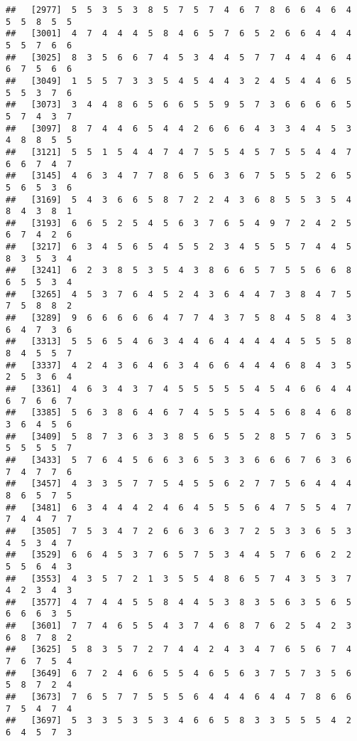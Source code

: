 \documentclass[
]{book}
\begin{document}
\begin{verbatim}
##   [2977]  5  5  3  5  3  8  5  7  5  7  4  6  7  8  6  6  4  6  4  5  5  8  5  5
##   [3001]  4  7  4  4  4  5  8  4  6  5  7  6  5  2  6  6  4  4  4  5  5  7  6  6
##   [3025]  8  3  5  6  6  7  4  5  3  4  4  5  7  7  4  4  4  6  4  6  7  5  6  6
##   [3049]  1  5  5  7  3  3  5  4  5  4  4  3  2  4  5  4  4  6  5  5  5  3  7  6
##   [3073]  3  4  4  8  6  5  6  6  5  5  9  5  7  3  6  6  6  6  5  5  7  4  3  7
##   [3097]  8  7  4  4  6  5  4  4  2  6  6  6  4  3  3  4  4  5  3  4  8  8  5  5
##   [3121]  5  5  1  5  4  4  7  4  7  5  5  4  5  7  5  5  4  4  7  6  6  7  4  7
##   [3145]  4  6  3  4  7  7  8  6  5  6  3  6  7  5  5  5  2  6  5  5  6  5  3  6
##   [3169]  5  4  3  6  6  5  8  7  2  2  4  3  6  8  5  5  3  5  4  8  4  3  8  1
##   [3193]  6  6  5  2  5  4  5  6  3  7  6  5  4  9  7  2  4  2  5  6  7  4  2  6
##   [3217]  6  3  4  5  6  5  4  5  5  2  3  4  5  5  5  7  4  4  5  8  3  5  3  4
##   [3241]  6  2  3  8  5  3  5  4  3  8  6  6  5  7  5  5  6  6  8  6  5  5  3  4
##   [3265]  4  5  3  7  6  4  5  2  4  3  6  4  4  7  3  8  4  7  5  7  5  8  8  2
##   [3289]  9  6  6  6  6  6  4  7  7  4  3  7  5  8  4  5  8  4  3  6  4  7  3  6
##   [3313]  5  5  6  5  4  6  3  4  4  6  4  4  4  4  4  5  5  5  8  8  4  5  5  7
##   [3337]  4  2  4  3  6  4  6  3  4  6  6  4  4  4  6  8  4  3  5  2  5  3  6  4
##   [3361]  4  6  3  4  3  7  4  5  5  5  5  5  4  5  4  6  6  4  4  6  7  6  6  7
##   [3385]  5  6  3  8  6  4  6  7  4  5  5  5  4  5  6  8  4  6  8  3  6  4  5  6
##   [3409]  5  8  7  3  6  3  3  8  5  6  5  5  2  8  5  7  6  3  5  5  5  5  5  7
##   [3433]  5  7  6  4  5  6  6  3  6  5  3  3  6  6  6  7  6  3  6  7  4  7  7  6
##   [3457]  4  3  3  5  7  7  5  4  5  5  6  2  7  7  5  6  4  4  4  8  6  5  7  5
##   [3481]  6  3  4  4  4  2  4  6  4  5  5  5  6  4  7  5  5  4  7  7  4  4  7  7
##   [3505]  7  5  3  4  7  2  6  6  3  6  3  7  2  5  3  3  6  5  3  4  5  3  4  7
##   [3529]  6  6  4  5  3  7  6  5  7  5  3  4  4  5  7  6  6  2  2  5  5  6  4  3
##   [3553]  4  3  5  7  2  1  3  5  5  4  8  6  5  7  4  3  5  3  7  4  2  3  4  3
##   [3577]  4  7  4  4  5  5  8  4  4  5  3  8  3  5  6  3  5  6  5  6  6  6  3  5
##   [3601]  7  7  4  6  5  5  4  3  7  4  6  8  7  6  2  5  4  2  3  6  8  7  8  2
##   [3625]  5  8  3  5  7  2  7  4  4  2  4  3  4  7  6  5  6  7  4  7  6  7  5  4
##   [3649]  6  7  2  4  6  6  5  5  4  6  5  6  3  7  5  7  3  5  6  5  8  7  2  4
##   [3673]  7  6  5  7  7  5  5  5  6  4  4  4  6  4  4  7  8  6  6  7  5  4  7  4
##   [3697]  5  3  3  5  3  5  3  4  6  6  5  8  3  3  5  5  5  4  2  6  4  5  7  3

\end{verbatim}
\end{document}
